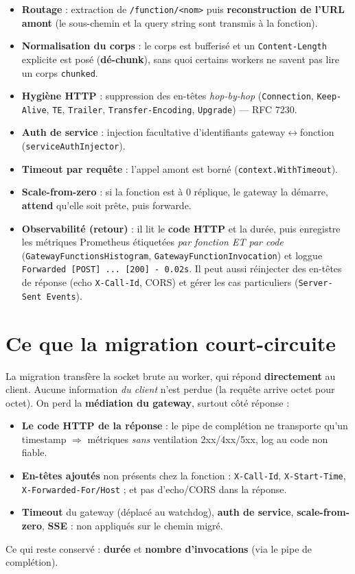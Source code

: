 \documentclass[10pt,a4paper]{article}
\newcommand{\code}[1]{\texttt{\small #1}}
\begin{document}
\begin{itemize}
\item \textbf{Routage} : extraction de \code{/function/<nom>} puis \textbf{reconstruction de l'URL amont} (le sous-chemin et la query string sont transmis à la fonction).
\item \textbf{Normalisation du corps} : le corps est bufferisé et un \code{Content-Length} explicite est posé (\textbf{dé-chunk}), sans quoi certains workers ne savent pas lire un corps \code{chunked}.
\item \textbf{Hygiène HTTP} : suppression des en-têtes \emph{hop-by-hop} (\code{Connection}, \code{Keep-Alive}, \code{TE}, \code{Trailer}, \code{Transfer-Encoding}, \code{Upgrade}) — RFC 7230.
\item \textbf{Auth de service} : injection facultative d'identifiants gateway$\leftrightarrow$fonction (\code{serviceAuthInjector}).
\item \textbf{Timeout par requête} : l'appel amont est borné (\code{context.WithTimeout}).
\item \textbf{Scale-from-zero} : si la fonction est à 0 réplique, le gateway la démarre, \textbf{attend} qu'elle soit prête, puis forwarde.
\item \textbf{Observabilité (retour)} : il lit le \textbf{code HTTP} et la durée, puis enregistre les métriques Prometheus étiquetées \emph{par fonction ET par code} (\code{GatewayFunctionsHistogram}, \code{GatewayFunctionInvocation}) et loggue \code{Forwarded [POST] ... [200] - 0.02s}. Il peut aussi réinjecter des en-têtes de réponse (echo \code{X-Call-Id}, CORS) et gérer les cas particuliers (\code{Server-Sent Events}).
\end{itemize}

\section{Ce que la migration court-circuite}

La migration transfère la socket brute au worker, qui répond \textbf{directement} au client. Aucune
information \emph{du client} n'est perdue (la requête arrive octet pour octet). On perd la
\textbf{médiation du gateway}, surtout côté réponse :

\begin{itemize}
\item \textbf{Le code HTTP de la réponse} : le pipe de complétion ne transporte qu'un timestamp $\Rightarrow$ métriques \emph{sans} ventilation 2xx/4xx/5xx, log au code non fiable.
\item \textbf{En-têtes ajoutés} non présents chez la fonction : \code{X-Call-Id}, \code{X-Start-Time}, \code{X-Forwarded-For/Host} ; et pas d'echo/CORS dans la réponse.
\item \textbf{Timeout} du gateway (déplacé au watchdog), \textbf{auth de service}, \textbf{scale-from-zero}, \textbf{SSE} : non appliqués sur le chemin migré.
\end{itemize}
Ce qui reste conservé : \textbf{durée} et \textbf{nombre d'invocations} (via le pipe de complétion).
\end{document}
